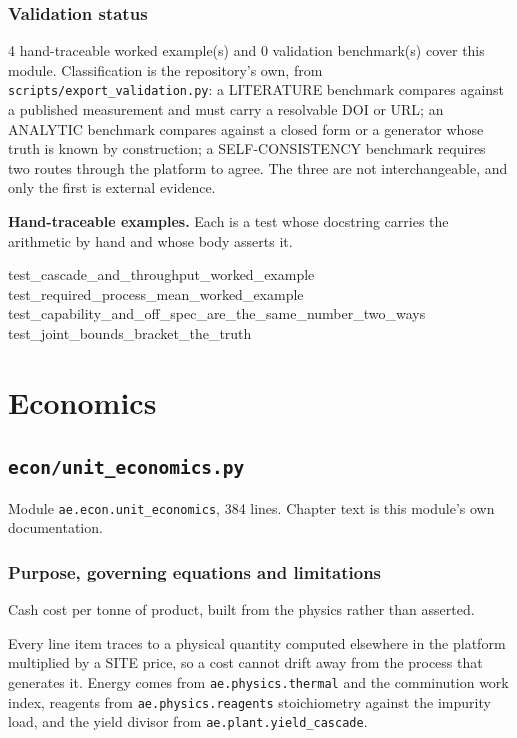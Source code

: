 \documentclass[10pt,a4paper,twoside]{report}
\newcommand{\theblurb}{}
\newcommand{\partblurb}[2]{%
  \renewcommand{\theblurb}{#2}%
  \part{#1}%
  \renewcommand{\theblurb}{}}
\begin{document}
\section{Validation status}

4 hand-traceable worked example(s) and 0 validation benchmark(s) cover this module. Classification is the repository's own, from \texttt{scripts/export\_validation.py}: a LITERATURE benchmark compares against a published measurement and must carry a resolvable DOI or URL; an ANALYTIC benchmark compares against a closed form or a generator whose truth is known by construction; a SELF-CONSISTENCY benchmark requires two routes through the platform to agree. The three are not interchangeable, and only the first is external evidence.

\textbf{Hand-traceable examples.} Each is a test whose docstring carries the arithmetic by hand and whose body asserts it.

\begin{verbatimsmall}
test_cascade_and_throughput_worked_example
test_required_process_mean_worked_example
test_capability_and_off_spec_are_the_same_number_two_ways
test_joint_bounds_bracket_the_truth
\end{verbatimsmall}

\clearpage

\partblurb{Economics}{Cost, capital and value, with uncertainty propagated rather than asserted.}

\chapter{\texttt{econ/unit\_economics.py}}\label{ch:unit_economics}


{\footnotesize\color{slate}Module \texttt{ae.econ.unit\_economics}, 384 lines. Chapter text is this module's own documentation.\par}

\section{Purpose, governing equations and limitations}

Cash cost per tonne of product, built from the physics rather than asserted.

Every line item traces to a physical quantity computed elsewhere in the platform multiplied by a SITE price, so a cost cannot drift away from the process that generates it. Energy comes from \texttt{ae.physics.thermal} and the comminution work index, reagents from \texttt{ae.physics.reagents} stoichiometry against the impurity load, and the yield divisor from \texttt{ae.plant.yield\_cascade}.
\end{document}
